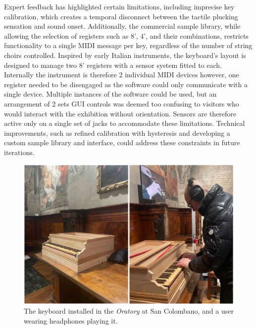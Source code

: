 Expert feedback has highlighted certain limitations, including imprecise key calibration, which creates a temporal disconnect between the tactile plucking sensation and sound onset. Additionally, the commercial sample library, while allowing the selection of registers such as 8', 4', and their combinations, restricts functionality to a single MIDI message per key, regardless of the number of string choirs controlled. Inspired by early Italian instruments, the keyboard's layout is designed to manage two 8' registers with a sensor system fitted to each. Internally the instrument is therefore 2 individual MIDI devices however, one register needed to be disengaged as the software could only communicate with a single device. 
Multiple instances of the software could be used, but an arrangement of 2 sets GUI controls was deemed too confusing to visitors who would interact with the exhibition without orientation.
Sensors are therefore active only on a single set of jacks to accommodate these limitations. Technical improvements, such as refined calibration with hysteresis and developing a custom sample library and interface, could address these constraints in future iterations.

\begin{figure}
\centering
\includegraphics[width = \linewidth]{src/images/keyboardMuseum.JPEG}
\caption{The keyboard installed in the \emph{Oratory} at San Colombano, and a user wearing headphones playing it.}
\label{fig:oratory}
\end{figure}


